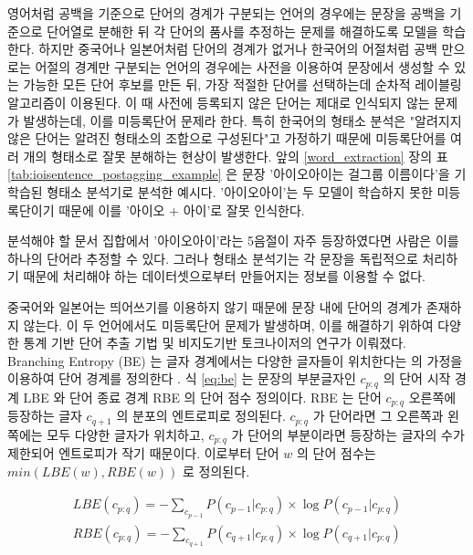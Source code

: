 \documentclass[11pt]{article}
\begin{document}
영어처럼 공백을 기준으로 단어의 경계가 구분되는 언어의 경우에는 문장을 공백을 기준으로 단어열로 분해한 뒤 각 단어의 품사를 추정하는 문제를 해결하도록 모델을 학습한다.
하지만 중국어나 일본어처럼 단어의 경계가 없거나 한국어의 어절처럼 공백 만으로는 어절의 경계만 구분되는 언어의 경우에는 사전을 이용하여 문장에서 생성할 수 있는 가능한 모든 단어 후보를 만든 뒤, 가장 적절한 단어를 선택하는데 순차적 레이블링 알고리즘이 이용된다.
이 때 사전에 등록되지 않은 단어는 제대로 인식되지 않는 문제가 발생하는데, 이를 미등록단어 문제라 한다.
특히 한국어의 형태소 분석은 "알려지지 않은 단어는 알려진 형태소의 조합으로 구성된다"고 가정하기 때문에 미등록단어를 여러 개의 형태소로 잘못 분해하는 현상이 발생한다.
앞의 \ref{word_extraction} 장의 표 \ref{tab:ioisentence_postagging_example} 은 문장 '아이오아이는 걸그룹 이름이다'을 기학습된 형태소 분석기로 분석한 예시다.
'아이오아이'는 두 모델이 학습하지 못한 미등록단이기 때문에 이를 '아이오 + 아이'로 잘못 인식한다.

분석해야 할 문서 집합에서 '아이오아이'라는 5음절이 자주 등장하였다면 사람은 이를 하나의 단어라 추정할 수 있다.
그러나 형태소 분석기는 각 문장을 독립적으로 처리하기 때문에 처리해야 하는 데이터셋으로부터 만들어지는 정보를 이용할 수 없다.

중국어와 일본어는 띄어쓰기를 이용하지 않기 때문에 문장 내에 단어의 경계가 존재하지 않는다.
이 두 언어에서도 미등록단어 문제가 발생하며, 이를 해결하기 위하여 다양한 통계 기반 단어 추출 기법 및 비지도기반 토크나이저의 연구가 이뤄졌다.
Branching Entropy (BE) 는 글자 경계에서는 다양한 글자들이 위치한다는 \citep{harris1954distributional} 의 가정을 이용하여 단어 경계를 정의한다 \citep{jin2006unsupervised}.
식 \ref{eq:be} 는 문장의 부분글자인 $c_{p:q}$ 의 단어 시작 경계 LBE 와 단어 종료 경계 RBE 의 단어 점수 정의이다.
RBE 는 단어 $c_{p:q}$ 오른쪽에 등장하는 글자 $c_{q+1}$ 의 분포의 엔트로피로 정의된다.
$c_{p:q}$ 가 단어라면 그 오른쪽과 왼쪽에는 모두 다양한 글자가 위치하고, $c_{p:q}$ 가 단어의 부분이라면 등장하는 글자의 수가 제한되어 엔트로피가 작기 때문이다.
이로부터 단어 $w$ 의 단어 점수는 $min(LBE(w), RBE(w))$ 로 정의된다.

\begin{equation}
\label{eq:be}
\begin{aligned}
LBE(c_{p:q}) = - \sum_{c_{p-1}} P(c_{p-1} \vert c_{p:q}) \times \log P(c_{p-1} \vert c_{p:q}) \\
RBE(c_{p:q}) = - \sum_{c_{q+1}} P(c_{q+1} \vert c_{p:q}) \times \log P(c_{q+1} \vert c_{p:q}) \\
\end{aligned}
\end{equation}
\end{document}
